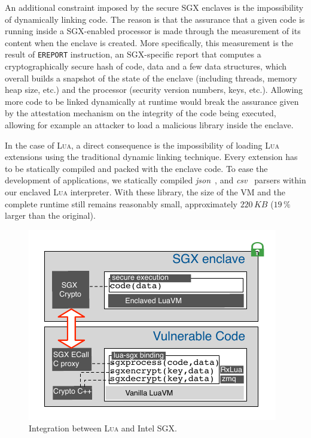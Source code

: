 An additional constraint imposed by the secure SGX enclaves is the impossibility of dynamically linking code. 
The reason is that the assurance that a given code is running inside a SGX-enabled processor is made through the measurement of its content when the enclave is created.
More specifically, this measurement is the result of \texttt{EREPORT} instruction, an SGX-specific report that computes a cryptographically secure hash of code, data and a few data structures, which overall builds a snapshot of the state of the enclave (including threads, memory heap size, etc.) and the processor (security version numbers, keys, etc.).
Allowing more code to be linked dynamically at runtime would break the assurance given by the attestation mechanism on the integrity of the code being executed, allowing for example an attacker to load a malicious library inside the enclave.

In the case of \textsc{Lua}, a direct consequence is the impossibility of loading \textsc{Lua} extensions using the traditional dynamic linking technique. 
Every extension has to be statically compiled and packed with the enclave code. 
To ease the development of \SYS applications, we statically compiled \emph{json}~\cite{rfc7159}, and \emph{csv}~\cite{rfc4180} parsers within our enclaved \textsc{Lua} interpreter.
With these library, the size of the VM and the complete runtime still remains reasonably small, approximately $220\,KB$ ($19\,\%$ larger than the original).

\begin{figure}[t!]
  \centering
  \includegraphics[width=.9\linewidth]{images/arch-sgxlua}
  \caption{Integration between \textsc{Lua} and Intel SGX.}
  \label{fig:arch-luasgx}
\end{figure}

